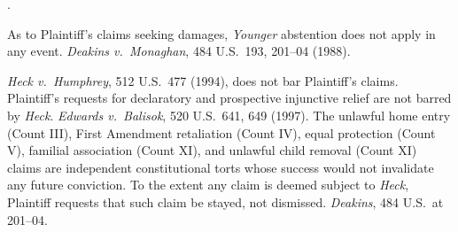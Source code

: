 \documentclass[12pt,letterpaper]{article}
\newcounter{complaintpara}
\newenvironment{paras}{%
	\begin{list}{\arabic{complaintpara}.}{%
			\setlength{\leftmargin}{0.5in}%
			\setlength{\labelwidth}{0.4in}%
			\setlength{\labelsep}{0.1in}%
			\setlength{\itemsep}{0pt}%
			\setlength{\parsep}{0pt}%
			\setlength{\topsep}{6pt}%
		}%
	}{%
	\end{list}%
}
\begin{document}
	\begin{paras}
		
		\item As to Plaintiff's claims seeking damages, \textit{Younger}
		abstention does not apply in any event.
		\textit{Deakins v.\ Monaghan}, 484 U.S.\ 193, 201--04 (1988).
		
		\item \textit{Heck v.\ Humphrey}, 512 U.S.\ 477 (1994), does not bar
		Plaintiff's claims. Plaintiff's requests for declaratory and
		prospective injunctive relief are not barred by \textit{Heck}.
		\textit{Edwards v.\ Balisok}, 520 U.S.\ 641, 649 (1997). The
		unlawful home entry (Count III), First Amendment retaliation
		(Count IV), equal protection (Count V), familial association
		(Count XI), and unlawful child removal (Count XI) claims are
		independent constitutional torts whose success would not invalidate
		any future conviction. To the extent any claim is deemed subject to
		\textit{Heck}, Plaintiff requests that such claim be stayed, not
		dismissed. \textit{Deakins}, 484 U.S.\ at 201--04.
		

\end{paras}
\end{document}
